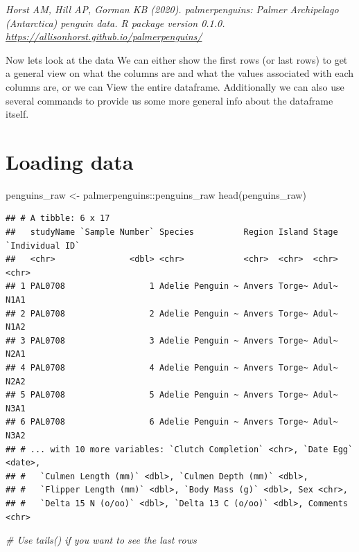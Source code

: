 \documentclass[
]{book}
\newenvironment{Shaded}{\begin{snugshade}}{\end{snugshade}}
\newcommand{\CommentTok}[1]{\textcolor[rgb]{0.56,0.35,0.01}{\textit{#1}}}
\newcommand{\FunctionTok}[1]{\textcolor[rgb]{0.00,0.00,0.00}{#1}}
\newcommand{\NormalTok}[1]{#1}
\newcommand{\OtherTok}[1]{\textcolor[rgb]{0.56,0.35,0.01}{#1}}
\newcommand{\SpecialCharTok}[1]{\textcolor[rgb]{0.00,0.00,0.00}{#1}}
\begin{document}
\emph{Horst AM, Hill AP, Gorman KB (2020). palmerpenguins: Palmer Archipelago (Antarctica) penguin data. R package version 0.1.0. \url{https://allisonhorst.github.io/palmerpenguins/}}

Now lets look at the data We can either show the first rows (or last rows) to get a general view on what the columns are and what the values associated with each columns are, or we can View the entire dataframe.
Additionally we can also use several commands to provide us some more general info about the dataframe itself.

\hypertarget{loading-data}{%
\section{Loading data}\label{loading-data}}

\begin{Shaded}
\begin{Highlighting}[]
\NormalTok{penguins\_raw }\OtherTok{\textless{}{-}}\NormalTok{ palmerpenguins}\SpecialCharTok{::}\NormalTok{penguins\_raw}
\FunctionTok{head}\NormalTok{(penguins\_raw)}
\end{Highlighting}
\end{Shaded}

\begin{verbatim}
## # A tibble: 6 x 17
##   studyName `Sample Number` Species          Region Island Stage `Individual ID`
##   <chr>               <dbl> <chr>            <chr>  <chr>  <chr> <chr>          
## 1 PAL0708                 1 Adelie Penguin ~ Anvers Torge~ Adul~ N1A1           
## 2 PAL0708                 2 Adelie Penguin ~ Anvers Torge~ Adul~ N1A2           
## 3 PAL0708                 3 Adelie Penguin ~ Anvers Torge~ Adul~ N2A1           
## 4 PAL0708                 4 Adelie Penguin ~ Anvers Torge~ Adul~ N2A2           
## 5 PAL0708                 5 Adelie Penguin ~ Anvers Torge~ Adul~ N3A1           
## 6 PAL0708                 6 Adelie Penguin ~ Anvers Torge~ Adul~ N3A2           
## # ... with 10 more variables: `Clutch Completion` <chr>, `Date Egg` <date>,
## #   `Culmen Length (mm)` <dbl>, `Culmen Depth (mm)` <dbl>,
## #   `Flipper Length (mm)` <dbl>, `Body Mass (g)` <dbl>, Sex <chr>,
## #   `Delta 15 N (o/oo)` <dbl>, `Delta 13 C (o/oo)` <dbl>, Comments <chr>
\end{verbatim}

\begin{Shaded}
\begin{Highlighting}[]
\CommentTok{\# Use tails() if you want to see the last rows}
\end{Highlighting}
\end{Shaded}
\end{document}
